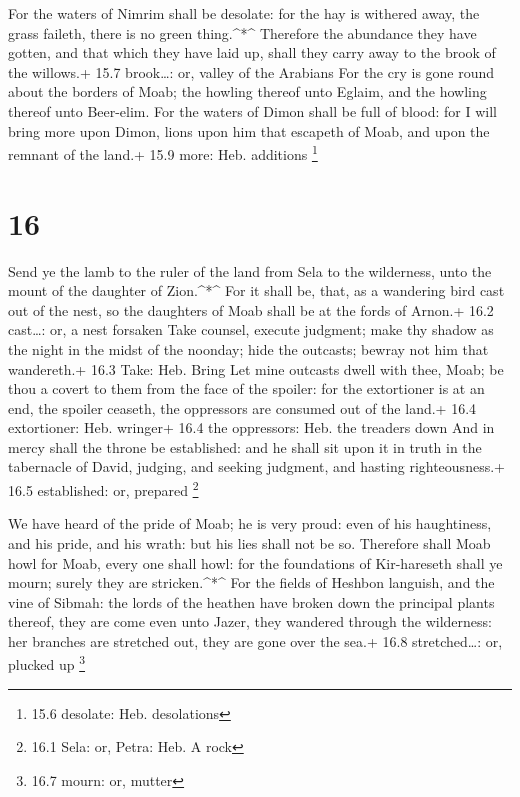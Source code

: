  For the waters of Nimrim shall be desolate: for the hay is
withered away, the grass faileth, there is no green thing.\^{}*\^{}
 Therefore the abundance they have gotten, and that which
they have laid up, shall they carry away to the brook of the willows.+
15.7 brook\ldots: or, valley of the Arabians  For the cry is
gone round about the borders of Moab; the howling thereof unto Eglaim,
and the howling thereof unto Beer-elim.  For the waters of
Dimon shall be full of blood: for I will bring more upon Dimon, lions
upon him that escapeth of Moab, and upon the remnant of the land.+ 15.9
more: Heb. additions \footnote{15.6 desolate: Heb. desolations}

\hypertarget{section-15}{%
\section{16}\label{section-15}}

 Send ye the lamb to the ruler of the land from Sela to the
wilderness, unto the mount of the daughter of Zion.\^{}*\^{}
 For it shall be, that, as a wandering bird cast out of the
nest, so the daughters of Moab shall be at the fords of Arnon.+ 16.2
cast\ldots: or, a nest forsaken  Take counsel, execute
judgment; make thy shadow as the night in the midst of the noonday; hide
the outcasts; bewray not him that wandereth.+ 16.3 Take: Heb. Bring
 Let mine outcasts dwell with thee, Moab; be thou a covert
to them from the face of the spoiler: for the extortioner is at an end,
the spoiler ceaseth, the oppressors are consumed out of the land.+ 16.4
extortioner: Heb. wringer+ 16.4 the oppressors: Heb. the treaders down
 And in mercy shall the throne be established: and he shall
sit upon it in truth in the tabernacle of David, judging, and seeking
judgment, and hasting righteousness.+ 16.5 established: or, prepared
\footnote{16.1 Sela: or, Petra: Heb. A rock}

 We have heard of the pride of Moab; he is very proud: even
of his haughtiness, and his pride, and his wrath: but his lies shall not
be so.  Therefore shall Moab howl for Moab, every one shall
howl: for the foundations of Kir-hareseth shall ye mourn; surely they
are stricken.\^{}*\^{}  For the fields of Heshbon languish,
and the vine of Sibmah: the lords of the heathen have broken down the
principal plants thereof, they are come even unto Jazer, they wandered
through the wilderness: her branches are stretched out, they are gone
over the sea.+ 16.8 stretched\ldots: or, plucked up \footnote{16.7
  mourn: or, mutter}

